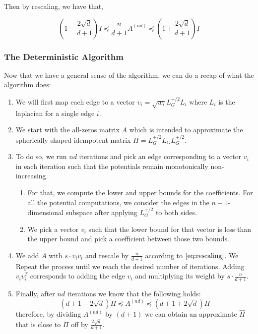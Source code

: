 \documentclass[
  letterpaper,
  DIV=11,
  numbers=noendperiod]{scrartcl}
\providecommand{\tightlist}{%
  \setlength{\itemsep}{0pt}\setlength{\parskip}{0pt}}\usepackage{longtable,booktabs,array}
\theoremstyle{plain}
\theoremstyle{plain}
\theoremstyle{plain}
\theoremstyle{definition}
\theoremstyle{remark}
\begin{document}
Then by rescaling, we have that,

\begin{equation} \tag{3} \label{eq:rescaling}
(1 - \frac{2\sqrt{d}}{d+1}) I \preceq \frac{n}{d+1}A^{(nd)} \preceq (1 + \frac{2\sqrt{d}}{d+1}) I
\end{equation}

\hypertarget{the-deterministic-algorithm}{%
\subsubsection{The Deterministic
Algorithm}\label{the-deterministic-algorithm}}

Now that we have a general sense of the algorithm, we can do a recap of
what the algorithm does:

\begin{enumerate}
\def\labelenumi{\arabic{enumi}.}
\item
  We will first map each edge to a vector
  \(v_i = \sqrt{w_i} L_G^{+/2} L_i\) where \(L_i\) is the laplacian for
  a single edge \(i\).
\item
  We start with the all-zeros matrix \(A\) which is intended to
  approximate the spherically shaped idempotent matrix
  \(\Pi = L_G^{+/2} L_G L_G^{+/2}\).
\item
  To do so, we run \(nd\) iterations and pick an edge corresponding to a
  vector \(v_i\) in each iteration such that the potentials remain
  monotonically non-increasing.

  \begin{enumerate}
  \def\labelenumii{\roman{enumii}.}
  \tightlist
  \item
    For that, we compute the lower and upper bounds for the
    coefficients. For all the potential computations, we consider the
    edges in the \(n-1\)-dimensional subspace after applying
    \(L_G^{+/2}\) to both sides.
  \item
    We pick a vector \(v_i\) such that the lower bound for that vector
    is less than the upper bound and pick a coefficient between those
    two bounds.
  \end{enumerate}
\item
  We add \(A\) with \(s \cdot v_i v_i\) and rescale by \(\frac{n}{d+1}\)
  according to \(\eqref{eq:rescaling}\). We Repeat the process until we
  reach the desired number of iterations. Adding \(v_i v_i^T\)
  corresponds to adding the edge \(v_i\) and multiplying its weight by
  \(s \cdot \frac{n}{d+1}\).
\item
  Finally, after \(nd\) iterations we know that the following holds:
  \[(d + 1 - 2 \sqrt{d}) \Pi \preceq A^{(nd)} \preceq (d + 1 + 2\sqrt{d}) \Pi\]
  therefore, by dividing \(A^{(nd)}\) by \((d + 1)\) we can obtain an
  approximate \(\hat{\Pi}\) that is close to \(\Pi\) off by
  \(\frac{2\sqrt{d}}{d+1}\).
\end{enumerate}
\end{document}
